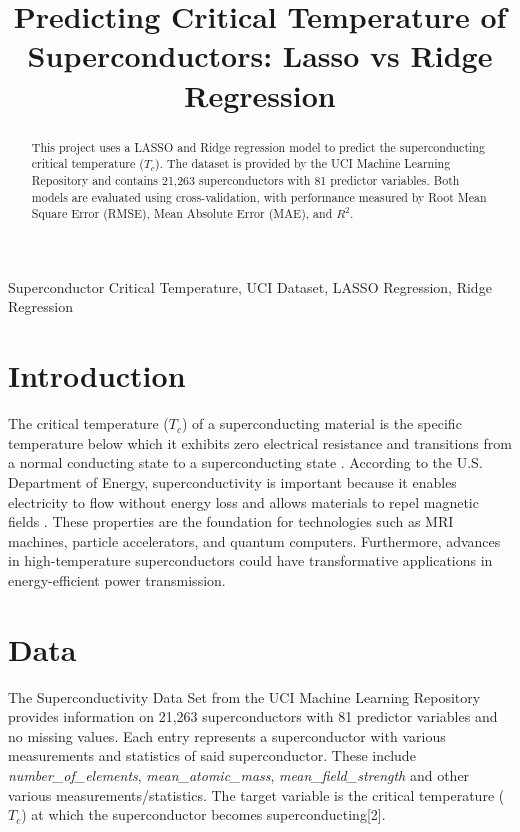 \documentclass[conference]{IEEEtran}
\title{Predicting Critical Temperature of Superconductors: Lasso vs Ridge Regression}
\author{
  \IEEEauthorblockN{Miguel Ramirez}
  \IEEEauthorblockA{
    Department of Statistics and Data Science \\
    University of Central Florida \\
    Orlando, United States \\
    miramirez@knights.ucf.edu}
}
\begin{document}
\maketitle

\begin{abstract}
This project uses a LASSO and Ridge regression model to predict the superconducting critical temperature ($T_c$). 
The dataset is provided by the UCI Machine Learning Repository and contains 21,263 superconductors with 81 predictor variables. 
Both models are evaluated using cross-validation, with performance measured by Root Mean Square Error (RMSE), Mean Absolute Error (MAE), and $R^2$.
\end{abstract}
\begin{IEEEkeywords}
Superconductor Critical Temperature, UCI Dataset, LASSO Regression, Ridge Regression
\end{IEEEkeywords}

\section*{Introduction}

The critical temperature ($T_c$) of a superconducting material is the specific temperature below which it exhibits zero electrical resistance and transitions from a normal conducting state to a superconducting state \cite{sciencedirect_tc}.
According to the U.S. Department of Energy, superconductivity is important because it enables electricity to flow without energy loss and allows materials to repel magnetic fields \cite{doe_superconductivity}.
These properties are the foundation for technologies such as MRI machines, particle accelerators, and quantum computers. 
Furthermore, advances in high-temperature superconductors could have transformative applications in energy-efficient power transmission.

\section{Data}
The Superconductivity Data Set from the UCI Machine Learning Repository provides information on 21,263 superconductors with 81 predictor variables and no missing values. 
Each entry represents a superconductor with various measurements and statistics of said superconductor. These include \emph{number\_of\_elements}, \emph{mean\_atomic\_mass}, \emph{mean\_field\_strength} and other various measurements/statistics. 
The target variable is the critical temperature ($T_c$) at which the superconductor becomes superconducting[2]. 
\end{document}
